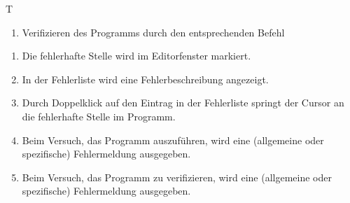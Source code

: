\begin{reqlist}{T}
{{\begin{enumerate}
				\item Verifizieren des Programms durch den entsprechenden Befehl
			\end{enumerate}
		}
		{
			\begin{enumerate}
				\item Die fehlerhafte Stelle wird im Editorfenster markiert.
				\item In der Fehlerliste wird eine Fehlerbeschreibung angezeigt.
				\item Durch Doppelklick auf den Eintrag in der Fehlerliste springt der Cursor an die fehlerhafte Stelle im Programm.
				\item Beim Versuch, das Programm auszuführen, wird eine (allgemeine oder spezifische) Fehlermeldung ausgegeben.
				\item Beim Versuch, das Programm zu verifizieren, wird eine (allgemeine oder spezifische) Fehlermeldung ausgegeben.
			\end{enumerate}	
		}
	}
	
	

\end{reqlist}
